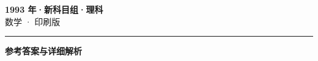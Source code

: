 \documentclass[zihao=5, a4paper]{ctexart}
\begin{document}
\begin{center}
  {\Large\bfseries 1993 年·新科目组·理科}\\[4pt]
  {\large 数学 · 印刷版}
\end{center}
\medskip
{}

\par\bigskip\hrule\bigskip
{}
\begin{center}{\large\bfseries 参考答案与详细解析}\end{center}
\smallskip

\end{document}
